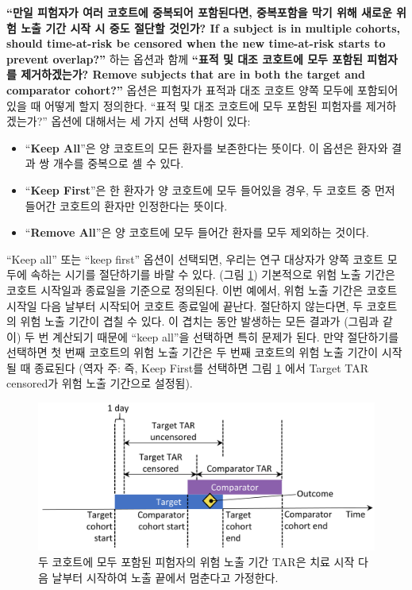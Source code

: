\documentclass[10.5pt]{book}
\providecommand{\tightlist}{%
  \setlength{\itemsep}{0pt}\setlength{\parskip}{0pt}}
\theoremstyle{definition}
\theoremstyle{definition}
\theoremstyle{definition}
\theoremstyle{remark}
\begin{document}
\textbf{``만일 피험자가 여러 코호트에 중복되어 포함된다면, 중복포함을
막기 위해 새로운 위험 노출 기간 시작 시 중도 절단할 것인가? If a subject
is in multiple cohorts, should time-at-risk be censored when the new
time-at-risk starts to prevent overlap?''} 하는 옵션과 함께
\textbf{``표적 및 대조 코호트에 모두 포함된 피험자를 제거하겠는가?
Remove subjects that are in both the target and comparator cohort?''}
옵션은 피험자가 표적과 대조 코호트 양쪽 모두에 포함되어 있을 때 어떻게
할지 정의한다. ``표적 및 대조 코호트에 모두 포함된 피험자를
제거하겠는가?'' 옵션에 대해서는 세 가지 선택 사항이 있다:

\begin{itemize}
\tightlist
\item
  ``\textbf{Keep All}''은 양 코호트의 모든 환자를 보존한다는 뜻이다. 이
  옵션은 환자와 결과 쌍 개수를 중복으로 셀 수 있다.
\item
  ``\textbf{Keep First}''은 한 환자가 양 코호트에 모두 들어있을 경우, 두
  코호트 중 먼저 들어간 코호트의 환자만 인정한다는 뜻이다.
\item
  ``\textbf{Remove All}''은 양 코호트에 모두 들어간 환자를 모두 제외하는
  것이다.
\end{itemize}

``Keep all'' 또는 ``keep first'' 옵션이 선택되면, 우리는 연구 대상자가
양쪽 코호트 모두에 속하는 시기를 절단하기를 바랄 수 있다. (그림
\ref{fig:tar}) 기본적으로 위험 노출 기간은 코호트 시작일과 종료일을
기준으로 정의된다. 이번 예에서, 위험 노출 기간은 코호트 시작일 다음
날부터 시작되어 코호트 종료일에 끝난다. 절단하지 않는다면, 두 코호트의
위험 노출 기간이 겹칠 수 있다. 이 겹치는 동안 발생하는 모든 결과가
(그림과 같이) 두 번 계산되기 때문에 ``keep all''을 선택하면 특히 문제가
된다. 만약 절단하기를 선택하면 첫 번째 코호트의 위험 노출 기간은 두 번째
코호트의 위험 노출 기간이 시작될 때 종료된다 (역자 주: 즉, Keep First를
선택하면 그림 \ref{fig:tar} 에서 Target TAR censored가 위험 노출
기간으로 설정됨).

\begin{figure}

{\centering \includegraphics[width=0.9\linewidth]{images/PopulationLevelEstimation/tar} 

}

\caption{두 코호트에 모두 포함된 피험자의 위험 노출 기간 TAR은 치료 시작 다음 날부터 시작하여 노출 끝에서 멈춘다고 가정한다.}\label{fig:tar}
\end{figure}
\end{document}
